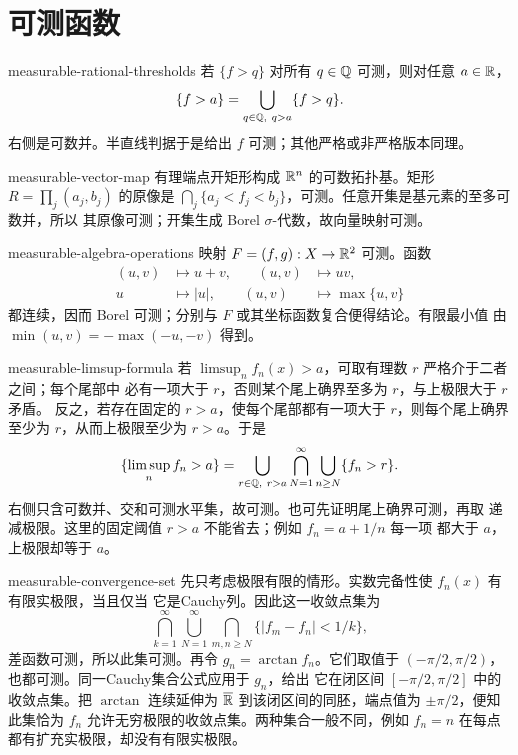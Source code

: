 \chapter{可测函数}

\begin{solution}{measurable-rational-thresholds}
若 $\{f>q\}$ 对所有 $q\in\mathbb{Q}$ 可测，则对任意 $a\in\mathbb{R}$，
\[
 \{f>a\}=\bigcup_{q\in\Q,\ q>a}\{f>q\}.
\]
右侧是可数并。半直线判据于是给出 $f$ 可测；其他严格或非严格版本同理。
\end{solution}

\begin{solution}{measurable-vector-map}
有理端点开矩形构成 $\mathbb{R}^n$ 的可数拓扑基。矩形
$R=\prod_j(a_j,b_j)$ 的原像是
$\bigcap_j\{a_j<f_j<b_j\}$，可测。任意开集是基元素的至多可数并，所以
其原像可测；开集生成 Borel $\sigma$-代数，故向量映射可测。
\end{solution}

\begin{solution}{measurable-algebra-operations}
映射 $F=(f,g):X\to\mathbb{R}^2$ 可测。函数
\[
 \begin{aligned}
 (u,v)&\longmapsto u+v,&\quad (u,v)&\longmapsto uv,\\
 u&\longmapsto |u|,& (u,v)&\longmapsto\max\{u,v\}
 \end{aligned}
\]
都连续，因而 Borel 可测；分别与 $F$ 或其坐标函数复合便得结论。有限最小值
由 $\min(u,v)=-\max(-u,-v)$ 得到。
\end{solution}

\begin{solution}{measurable-limsup-formula}
若 $\limsup_nf_n(x)>a$，可取有理数 $r$ 严格介于二者之间；每个尾部中
必有一项大于 $r$，否则某个尾上确界至多为 $r$，与上极限大于 $r$ 矛盾。
反之，若存在固定的 $r>a$，使每个尾部都有一项大于 $r$，则每个尾上确界
至少为 $r$，从而上极限至少为 $r>a$。于是
\[
 \{\limsup_nf_n>a\}
 =\bigcup_{r\in\mathbb{Q},\ r>a}
   \bigcap_{N=1}^{\infty}\bigcup_{n\ge N}\{f_n>r\}.
\]
右侧只含可数并、交和可测水平集，故可测。也可先证明尾上确界可测，再取
递减极限。这里的固定阈值 $r>a$ 不能省去；例如 $f_n=a+1/n$ 每一项
都大于 $a$，上极限却等于 $a$。
\end{solution}

\begin{solution}{measurable-convergence-set}
先只考虑极限有限的情形。实数完备性使 $f_n(x)$ 有有限实极限，当且仅当
它是Cauchy列。因此这一收敛点集为
\[
 \bigcap_{k=1}^{\infty}\bigcup_{N=1}^{\infty}
 \bigcap_{m,n\ge N}\{|f_m-f_n|<1/k\},
\]
差函数可测，所以此集可测。再令 $g_n=\arctan f_n$。它们取值于
$(-\pi/2,\pi/2)$，也都可测。同一Cauchy集合公式应用于 $g_n$，给出
它在闭区间 $[-\pi/2,\pi/2]$ 中的收敛点集。把 $\arctan$ 连续延伸为
$\overline{\mathbb{R}}$ 到该闭区间的同胚，端点值为 $\pm\pi/2$，便知此集恰为
$f_n$ 允许无穷极限的收敛点集。两种集合一般不同，例如 $f_n=n$ 在每点
都有扩充实极限，却没有有限实极限。
\end{solution}

